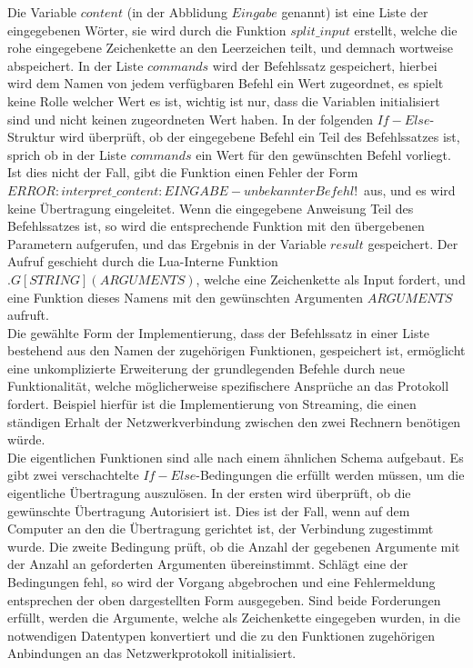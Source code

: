 Die Variable $content$ (in der Abblidung $Eingabe$ genannt) ist eine Liste der eingegebenen Wörter, sie wird durch die Funktion $split\_input$ erstellt, welche die rohe eingegebene Zeichenkette an den Leerzeichen teilt, und demnach wortweise abspeichert. In der Liste $commands$ wird der Befehlssatz gespeichert, hierbei wird dem Namen von jedem verfügbaren Befehl ein Wert zugeordnet, es spielt keine Rolle welcher Wert es ist, wichtig ist nur, dass die Variablen initialisiert sind und nicht keinen zugeordneten Wert haben. In der folgenden $If-Else$-Struktur wird überprüft, ob der eingegebene Befehl ein Teil des Befehlssatzes ist, sprich ob in der Liste $commands$ ein Wert für den gewünschten Befehl vorliegt. Ist dies nicht der Fall, gibt die Funktion einen Fehler der Form \glqq$ERROR: interpret\_content: EINGABE - unbekannter Befehl!$\grqq\ aus, und es wird keine Übertragung eingeleitet. Wenn die eingegebene Anweisung Teil des Befehlssatzes ist, so wird die entsprechende Funktion mit den übergebenen Parametern aufgerufen, und das Ergebnis in der Variable $result$ gespeichert. Der Aufruf geschieht durch die Lua-Interne Funktion $.G[STRING](ARGUMENTS)$, welche eine Zeichenkette als Input fordert, und eine Funktion dieses Namens mit den gewünschten Argumenten $ARGUMENTS$ aufruft.\\ 
Die gewählte Form der Implementierung, dass der Befehlssatz in einer Liste bestehend aus den Namen der zugehörigen Funktionen, gespeichert ist, ermöglicht eine unkomplizierte Erweiterung der grundlegenden Befehle durch neue Funktionalität, welche möglicherweise spezifischere Ansprüche an das Protokoll fordert. 
Beispiel hierfür ist die Implementierung von Streaming, die einen ständigen Erhalt der Netzwerkverbindung zwischen den zwei Rechnern benötigen würde. \\
Die eigentlichen Funktionen sind alle nach einem ähnlichen Schema aufgebaut. 
Es gibt zwei verschachtelte $If-Else$-Bedingungen die erfüllt werden müssen, um die eigentliche Übertragung auszulösen. 
In der ersten wird überprüft, ob die gewünschte Übertragung Autorisiert ist. 
Dies ist der Fall, wenn auf dem Computer an den die Übertragung gerichtet ist, der Verbindung zugestimmt wurde. 
Die zweite Bedingung prüft, ob die Anzahl der gegebenen Argumente mit der Anzahl an geforderten Argumenten übereinstimmt. 
Schlägt eine der Bedingungen fehl, so wird der Vorgang abgebrochen und eine Fehlermeldung entsprechen der oben dargestellten Form ausgegeben. 
Sind beide Forderungen erfüllt, werden die Argumente, welche als Zeichenkette eingegeben wurden, in die notwendigen Datentypen konvertiert und die zu den Funktionen zugehörigen Anbindungen an das Netzwerkprotokoll initialisiert.  \\\hfill\\
